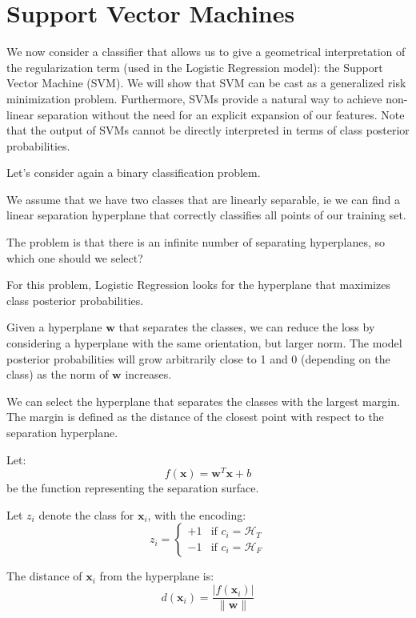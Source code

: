 
\setlength{\parindent}{0pt}
\setlength{\parskip}{0.7em}

\section*{Support Vector Machines}

We now consider a classifier that allows us to give a geometrical interpretation of the
regularization term (used in the Logistic Regression model): the Support Vector Machine
(SVM). We will show that SVM can be cast as a generalized risk minimization problem.
Furthermore, SVMs provide a natural way to achieve non-linear separation without the
need for an explicit expansion of our features. Note that the output of SVMs cannot be
directly interpreted in terms of class posterior probabilities.

Let's consider again a binary classification problem.

We assume that we have two classes that are linearly separable, ie we can find a linear
separation hyperplane that correctly classifies all points of our training set.

The problem is that there is an infinite number of separating hyperplanes, so which one
should we select?

For this problem, Logistic Regression looks for the hyperplane that maximizes class
posterior probabilities.

Given a hyperplane $\mathbf{w}$ that separates the classes, we can reduce the loss by considering
a hyperplane with the same orientation, but larger norm. The model posterior probabilities
will grow arbitrarily close to 1 and 0 (depending on the class) as the norm of $\mathbf{w}$
increases.

We can select the hyperplane that separates the classes with the largest margin. The
margin is defined as the distance of the closest point with respect to the separation
hyperplane.

Let:
\[
f(\mathbf{x}) = \mathbf{w}^T \mathbf{x} + b
\]
be the function representing the separation surface.

Let $z_i$ denote the class for $\mathbf{x}_i$, with the encoding:
\[
z_i = \begin{cases} +1 & \text{if } c_i = \mathcal{H}_T \\ -1 & \text{if } c_i = \mathcal{H}_F \end{cases}
\]

The distance of $\mathbf{x}_i$ from the hyperplane is:
\[
d(\mathbf{x}_i) = \frac{|f(\mathbf{x}_i)|}{\|\mathbf{w}\|}
\]

